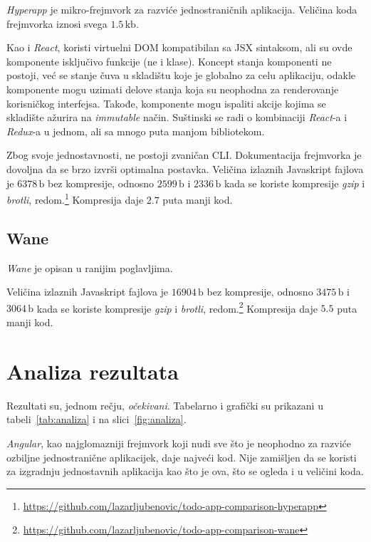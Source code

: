 \textsl{Hyperapp} je mikro-frejmvork za razviće jednostraničnih aplikacija.
Veličina koda frejmvorka iznosi svega $1.5\,\mathrm{kb}$.

Kao i \textsl{React}, koristi virtuelni DOM kompatibilan sa JSX sintaksom, ali su ovde komponente isključivo funkcije (ne i klase).
Koncept stanja komponenti ne postoji, već se stanje čuva u skladištu koje je globalno za celu aplikaciju, odakle komponente mogu uzimati delove stanja koja su neophodna za renderovanje korisničkog interfejsa.
Takođe, komponente mogu ispaliti akcije kojima se skladište ažurira na \textit{immutable} način.
Suštinski se radi o kombinaciji \textit{React}-a i \textit{Redux}-a u jednom, ali sa mnogo puta manjom bibliotekom.

Zbog svoje jednostavnosti, ne postoji zvaničan CLI.
Dokumentacija frejmvorka je dovoljna da se brzo izvrši optimalna postavka.
Veličina izlaznih Javaskript fajlova je $6378\,\mathrm{b}$ bez kompresije, odnosno $2599\,\mathrm{b}$ i $2336\,\mathrm{b}$ kada se koriste kompresije \textsl{gzip} i \textsl{brotli}, redom.\footnote{\url{https://github.com/lazarljubenovic/todo-app-comparison-hyperapp}} Kompresija daje $2.7$ puta manji kod.

\subsection{Wane}

\textsl{Wane} je opisan u ranijim poglavljima.

Veličina izlaznih Javaskript fajlova je $16904\,\mathrm{b}$ bez kompresije, odnosno $3475\,\mathrm{b}$ i $3064\,\mathrm{b}$ kada se koriste kompresije \textsl{gzip} i \textsl{brotli}, redom.\footnote{\url{https://github.com/lazarljubenovic/todo-app-comparison-wane}} Kompresija daje $5.5$ puta manji kod.

\section{Analiza rezultata}
\label{sec:analiza}

Rezultati su, jednom rečju, \emph{očekivani}.
Tabelarno i grafički su prikazani u tabeli~\ref{tab:analiza} i na slici~\ref{fig:analiza}.

\textsl{Angular}, kao najglomazniji frejmvork koji nudi sve što je neophodno za razviće ozbiljne jednostranične aplikacijek, daje najveći kod.
Nije zamišljen da se koristi za izgradnju jednostavnih aplikacija kao što je ova, što se ogleda i u veličini koda.

